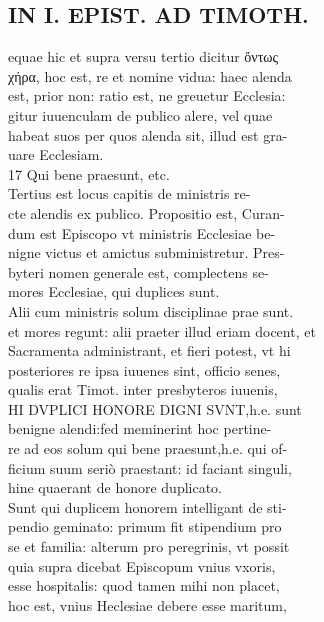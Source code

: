 \documentclass{article}
\begin{document}
\begin{pages}
\section*{IN I. EPIST. AD TIMOTH. \\
                }
equae hic et supra versu tertio dicitur ὄντως \\
                χήρα, hoc est, re et nomine vidua: haec alenda \\
                est, prior non: ratio est, ne greuetur Ecclesia: \\
                gitur iuuenculam de publico alere, vel quae \\
                habeat suos per quos alenda sit, illud est gra- \\
                uare Ecclesiam. \\
                17 Qui bene praesunt, etc. \\
                Tertius est locus capitis de ministris re- \\
                cte alendis ex publico. Propositio est, Curan- \\
                dum est Episcopo vt ministris Ecclesiae be- \\
                nigne victus et amictus subministretur. Pres- \\
                byteri nomen generale est, complectens se- \\
                mores Ecclesiae, qui duplices sunt. \\
                Alii cum ministris solum disciplinae prae sunt. \\
                et mores regunt: alii praeter illud eriam docent, et \\
                Sacramenta administrant, et fieri potest, vt hi \\
                posteriores re ipsa iuuenes sint, officio senes, \\
                qualis erat Timot. inter presbyteros iuuenis, \\
                HI DVPLICI HONORE DIGNI SVNT,h.e. sunt \\
                benigne alendi:fed meminerint hoc pertine- \\
                re ad eos solum qui bene praesunt,h.e. qui of- \\
                ficium suum seriò praestant: id faciant singuli, \\
                hine quaerant de honore duplicato. \\
                Sunt qui duplicem honorem intelligant de sti- \\
                pendio geminato: primum fit stipendium pro \\
                se et familia: alterum pro peregrinis, vt possit \\
                quia supra dicebat Episcopum vnius vxoris, \\
                esse hospitalis: quod tamen mihi non placet, \\
                hoc est, vnius Heclesiae debere esse maritum, \\
                

\end{pages}
\end{document}
